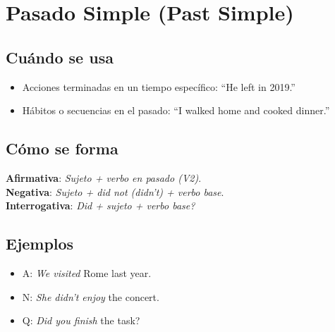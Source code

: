 \documentclass[11pt,a4paper]{article}
\begin{document}
\section{Pasado Simple (Past Simple)}
\subsection*{Cuándo se usa}
\begin{itemize}
  \item Acciones terminadas en un tiempo específico: ``He left in 2019.''
  \item Hábitos o secuencias en el pasado: ``I walked home and cooked dinner.''
\end{itemize}

\subsection*{Cómo se forma}
\textbf{Afirmativa}: \emph{Sujeto + verbo en pasado (V2)}.\\
\textbf{Negativa}: \emph{Sujeto + did not (didn’t) + verbo base}.\\
\textbf{Interrogativa}: \emph{Did + sujeto + verbo base?}

\subsection*{Ejemplos}
\begin{itemize}
  \item A: \emph{We visited} Rome last year.
  \item N: \emph{She didn’t enjoy} the concert.
  \item Q: \emph{Did you finish} the task?
\end{itemize}
\end{document}
